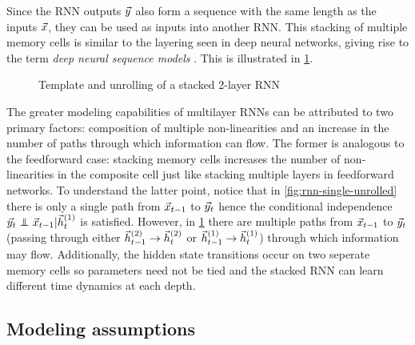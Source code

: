 Since the RNN outputs $\vec{y}$ also form a sequence with the same length as
the inputs $\vec{x}$, they can be used as inputs into another RNN. This
stacking of multiple memory cells is similar to the layering seen in deep
neural networks, giving rise to the term \emph{deep neural sequence models}
. This is illustrated in \cref{fig:rnn-multi-unrolled}.

\begin{figure}[tb]
    \centering
    \resizebox{4.5in}{!}{}
    \caption{Template and unrolling of a stacked 2-layer RNN}
    \label{fig:rnn-multi-unrolled}
\end{figure}

The greater modeling capabilities of multilayer RNNs can be attributed to two
primary factors: composition of multiple non-linearities and an increase in the
number of paths through which information can flow. The former is analogous to
the feedforward case: stacking memory cells increases the number of
non-linearities in the composite cell just like stacking multiple layers in
feedforward networks. To understand the latter point, notice that in
\cref{fig:rnn-single-unrolled} there is only a single path from
$\vec{x}_{t-1}$ to $\vec{y}_{t}$ hence the conditional independence
$\y_{t} \independent \x_{t-1} | \h^{(1)}_t$ is satisfied.
However, in \cref{fig:rnn-multi-unrolled} there are multiple paths from
$\vec{x}_{t-1}$ to $\vec{y}_{t}$ (\eg passing through either
$\vec{h}^{(2)}_{t-1} \to \vec{h}^{(2)}_t$ or $\vec{h}^{(1)}_{t-1} \to
\vec{h}^{(1)}_t$) through which information may flow. Additionally, the
hidden state transitions occur on two seperate memory cells so parameters
need not be tied and the stacked RNN can learn different time dynamics
at each depth.

\subsection{Modeling assumptions}



